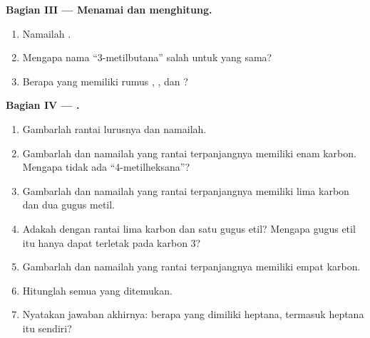 \begin{problem}
\medskip
\noindent\textbf{Bagian III --- Menamai dan menghitung.}
\begin{enumerate}[resume]
  \item Namailah .
  \item Mengapa nama ``3-metilbutana'' salah untuk  yang sama?
  \item Berapa   yang memiliki rumus ,
        , dan ?
\end{enumerate}

\medskip
\noindent\textbf{Bagian IV ---  .}
\begin{enumerate}[resume]
  \item Gambarlah  rantai lurusnya dan namailah.
  \item Gambarlah dan namailah  yang rantai terpanjangnya
        memiliki enam  karbon. Mengapa tidak ada ``4-metilheksana''?
  \item Gambarlah dan namailah  yang rantai terpanjangnya
        memiliki lima  karbon dan dua gugus metil.
  \item Adakah  dengan rantai lima karbon dan satu gugus etil?
        Mengapa gugus etil itu hanya dapat terletak pada karbon 3?
  \item Gambarlah dan namailah  yang rantai terpanjangnya memiliki
        empat  karbon.
  \item Hitunglah semua  yang ditemukan.
  \item Nyatakan jawaban akhirnya: berapa  yang dimiliki
        heptana, termasuk heptana itu sendiri?
\end{enumerate}
\end{problem}
